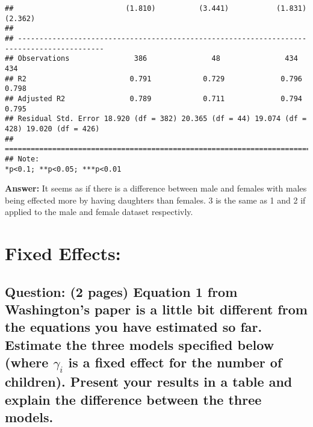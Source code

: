 \documentclass[
]{article}
\begin{document}
\begin{verbatim}
##                          (1.810)          (3.441)           (1.831)           (2.362)     
##                                                                                           
## ------------------------------------------------------------------------------------------
## Observations               386               48               434               434       
## R2                        0.791            0.729             0.796             0.798      
## Adjusted R2               0.789            0.711             0.794             0.795      
## Residual Std. Error 18.920 (df = 382) 20.365 (df = 44) 19.074 (df = 428) 19.020 (df = 426)
## ==========================================================================================
## Note:                                                          *p<0.1; **p<0.05; ***p<0.01
\end{verbatim}

\textbf{Answer:} It seems as if there is a difference between male and
females with males being effected more by having daughters than females.
3 is the same as 1 and 2 if applied to the male and female dataset
respectivly.

\clearpage

\hypertarget{fixed-effects}{%
\section{Fixed Effects:}\label{fixed-effects}}

\hypertarget{question-2-pages-equation-1-from-washingtons-paper-is-a-little-bit-different-from-the-equations-you-have-estimated-so-far.-estimate-the-three-models-specified-below-where-gamma_i-is-a-fixed-effect-for-the-number-of-children.-present-your-results-in-a-table-and-explain-the-difference-between-the-three-models.}{%
\subsection{\texorpdfstring{Question: (2 pages) Equation 1 from
Washington's paper is a little bit different from the equations you have
estimated so far. Estimate the three models specified below (where
\(\gamma_i\) is a fixed effect for the number of children). Present your
results in a table and explain the difference between the three
models.}{Question: (2 pages) Equation 1 from Washington's paper is a little bit different from the equations you have estimated so far. Estimate the three models specified below (where \textbackslash gamma\_i is a fixed effect for the number of children). Present your results in a table and explain the difference between the three models.}}\label{question-2-pages-equation-1-from-washingtons-paper-is-a-little-bit-different-from-the-equations-you-have-estimated-so-far.-estimate-the-three-models-specified-below-where-gamma_i-is-a-fixed-effect-for-the-number-of-children.-present-your-results-in-a-table-and-explain-the-difference-between-the-three-models.}}
\end{document}
